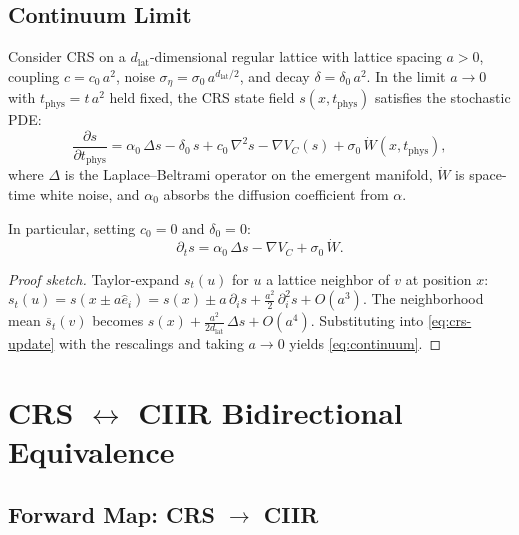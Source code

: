 \subsection{Continuum Limit}

\begin{theorem}\label{thm:12.7}
Consider CRS on a $d_{\mathrm{lat}}$-dimensional regular lattice with
lattice spacing $a > 0$, coupling $c = c_0\,a^2$, noise
$\sigma_\eta = \sigma_0\,a^{d_{\mathrm{lat}}/2}$, and decay
$\delta = \delta_0\,a^2$.  In the limit $a \to 0$ with
$t_{\mathrm{phys}} = t\,a^2$ held fixed, the CRS state field
$s(x, t_{\mathrm{phys}})$ satisfies the stochastic PDE:
\begin{equation}\label{eq:continuum}
  \frac{\partial s}{\partial t_{\mathrm{phys}}} =
  \alpha_0\,\Delta s - \delta_0\,s + c_0\,\nabla^2 s
  - \nabla V_C(s) + \sigma_0\,\dot{W}(x, t_{\mathrm{phys}}),
\end{equation}
where $\Delta$ is the Laplace--Beltrami operator on the emergent manifold,
$\dot{W}$ is space-time white noise, and $\alpha_0$ absorbs the diffusion
coefficient from $\alpha$.

In particular, setting $c_0 = 0$ and $\delta_0 = 0$:
\begin{equation}\label{eq:diffusion-limit}
  \partial_t s = \alpha_0\,\Delta s - \nabla V_C + \sigma_0\,\dot{W}.
\end{equation}
\end{theorem}

\begin{proof}[Proof sketch]
Taylor-expand $s_t(u)$ for $u$ a lattice neighbor of $v$ at position
$x$: $s_t(u) = s(x \pm a\hat{e}_i) = s(x) \pm a\,\partial_i s
+ \frac{a^2}{2}\,\partial_i^2 s + O(a^3)$.  The neighborhood mean
$\overline{s}_t(v)$ becomes $s(x) + \frac{a^2}{2d_{\mathrm{lat}}}\,\Delta s + O(a^4)$.
Substituting into \eqref{eq:crs-update} with the rescalings and taking
$a \to 0$ yields \eqref{eq:continuum}.
\end{proof}

\section{CRS $\leftrightarrow$ CIIR Bidirectional Equivalence}
\label{sec:equivalence}

\subsection{Forward Map: CRS $\to$ CIIR}

